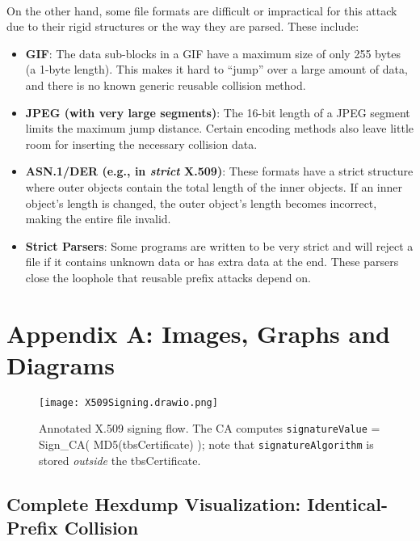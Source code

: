 \documentclass[runningheads]{llncs}
\begin{document}
    \paragraph{}
    On the other hand, some file formats are difficult or impractical for this attack due to their rigid structures or the way they are parsed. These include:
    \begin{itemize}
        \item \textbf{GIF}: The data sub-blocks in a GIF have a maximum size of only 255 bytes (a 1-byte length). This makes it hard to “jump” over a large amount of data, and there is no known generic reusable collision method.
        \item \textbf{JPEG (with very large segments)}: The 16-bit length of a JPEG segment limits the maximum jump distance. Certain encoding methods also leave little room for inserting the necessary collision data.
        \item \textbf{ASN.1/DER (e.g., in \textit{strict} X.509)}: These formats have a strict structure where outer objects contain the total length of the inner objects. If an inner object's length is changed, the outer object's length becomes incorrect, making the entire file invalid.
        \item \textbf{Strict Parsers}: Some programs are written to be very strict and will reject a file if it contains unknown data or has extra data at the end. These parsers close the loophole that reusable prefix attacks depend on.
    \end{itemize}

    \newpage
    \section{Appendix A: Images, Graphs and Diagrams}

    \begin{figure}
        \centering
        \texttt{[image: X509Signing.drawio.png]}
        \caption{Annotated X.509 signing flow. The CA computes \texttt{signatureValue} = Sign\_CA( MD5(tbsCertificate) ); note that \texttt{signatureAlgorithm} is stored \emph{outside} the tbsCertificate.}
        \label{fig:x509-signing}
    \end{figure}

    \subsection{Complete Hexdump Visualization: Identical-Prefix Collision}
\end{document}

